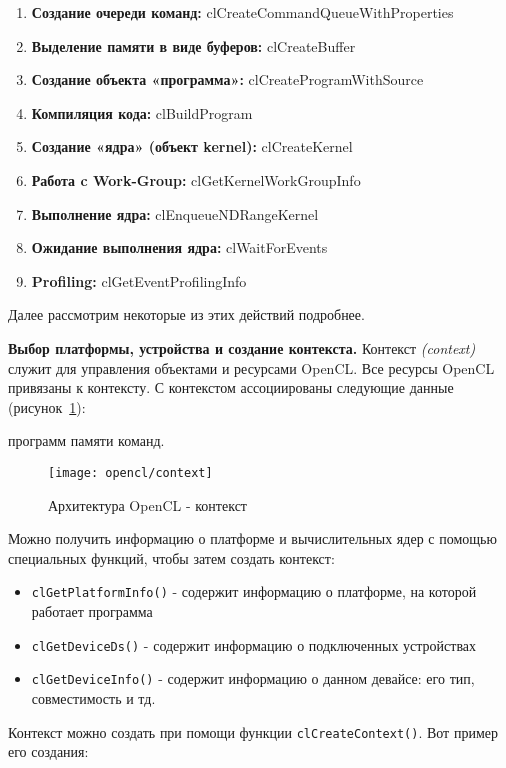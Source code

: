 {\begin{enumerate}
			\item\textbf{Создание очереди команд:} cl\-Create\-Command\-Queue\-With\-Pro\-per\-ties
			\item\textbf{Выделение памяти в виде буферов:} clCreateBuffer
			\item\textbf{Создание объекта «программа»:} clCreateProgramWithSource
			\item\textbf{Компиляция кода:} clBuildProgram
			\item\textbf{Создание «ядра» (объект kernel):} clCreateKernel
			\item\textbf{Работа c Work-Group:} clGetKernelWorkGroupInfo 
			\item\textbf{Выполнение ядра:} clEnqueueNDRangeKernel 
			\item\textbf{Ожидание выполнения ядра:} clWaitForEvents 
			\item\textbf{Profiling:} clGetEventProfilingInfo
		\end{enumerate}
	Далее рассмотрим некоторые из этих действий подробнее.
	\par\textbf{Выбор платформы, устройства и создание контекста.} Контекст \textit{(context)} служит для управления объектами и ресурсами OpenCL. Все ресурсы OpenCL привязаны к контексту. С контекстом ассоциированы следующие данные (рисунок~\ref{OpenCLContext:image}):
		\begin{itemize}
			 программ
			 памяти
			 команд.
		\end{itemize}
	\begin{figure}[H]
		\texttt{[image: opencl/context]}
		\caption{Архитектура OpenCL - контекст}
		\label{OpenCLContext:image}
	\end{figure}
	Можно получить информацию о платформе и вычислительных ядер с помощью специальных функций, чтобы затем создать контекст:
		\begin{itemize}
			\item\texttt{clGetPlatformInfo()} - содержит информацию о платформе, на которой работает программа
			\item\texttt{clGetDeviceDs()} - содержит информацию о подключенных устройствах
			\item\texttt{clGetDeviceInfo()} - содержит информацию о данном девайсе: его тип, совместимость и тд.
		\end{itemize}
	Контекст можно создать при помощи функции \texttt{clCreateContext()}. Вот пример его создания:

    \inputminted{c++}{listings/OpenCLContextExample.c}
    
}
